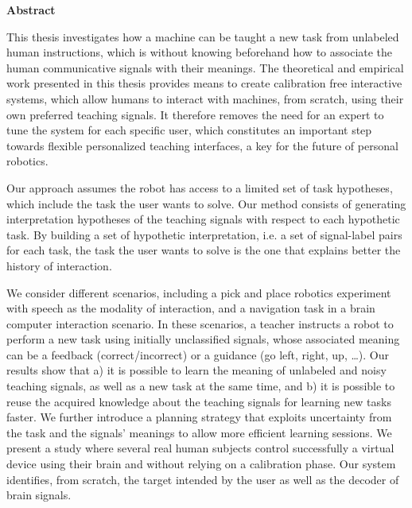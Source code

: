 
\begin{vcenterpage}

\begin{center}
{\LARGE\textbf{Abstract}}
\end{center}


This thesis investigates how a machine can be taught a new task from unlabeled human instructions, which is without knowing beforehand how to associate the human communicative signals with their meanings. The theoretical and empirical work presented in this thesis provides means to create calibration free interactive systems, which allow humans to interact with machines, from scratch, using their own preferred teaching signals. It therefore removes the need for an expert to tune the system for each specific user, which constitutes an important step towards flexible personalized teaching interfaces, a key for the future of personal robotics.

Our approach assumes the robot has access to a limited set of task hypotheses, which include the task the user wants to solve. Our method consists of generating interpretation hypotheses of the teaching signals with respect to each hypothetic task. By building a set of hypothetic interpretation, i.e. a set of signal-label pairs for each task, the task the user wants to solve is the one that explains better the history of interaction.

We consider different scenarios, including a pick and place robotics experiment with speech as the modality of interaction, and a navigation task in a brain computer interaction scenario. In these scenarios, a teacher instructs a robot to perform a new task using initially unclassified signals, whose associated meaning can be a feedback (correct/incorrect) or a guidance (go left, right, up, \ldots). Our results show that a) it is possible to learn the meaning of unlabeled and noisy teaching signals, as well as a new task at the same time, and b) it is possible to reuse the acquired knowledge about the teaching signals for learning new tasks faster. We further introduce a planning strategy that exploits uncertainty from the task and the signals' meanings to allow more efficient learning sessions. We present a study where several real human subjects control successfully a virtual device using their brain and without relying on a calibration phase. Our system identifies, from scratch, the target intended by the user as well as the decoder of brain signals.


\end{vcenterpage}
